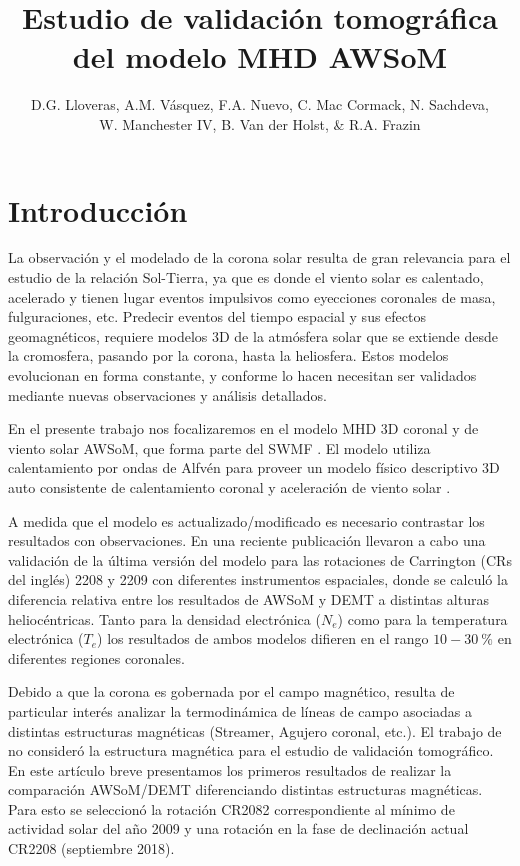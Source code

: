 \documentclass[baaa]{baaa}
\title{Estudio de validación tomográfica del modelo MHD AWSoM}
\author{D.G. Lloveras\inst{1}, A.M. Vásquez\inst{1}, F.A. Nuevo\inst{1}, C. Mac Cormack\inst{1}, N. Sachdeva\inst{2},\\ W. Manchester IV\inst{2}, B. Van der Holst\inst{2}, \& R.A. Frazin\inst{2}}
\institute{
Insituto de Astronomía y Física del Espacio, CONICET--UBA, Argentina \and
Climate and Space Sciences and Engineering, Universidad de Michigan, EEUU.
}
\begin{document}
\maketitle

\section{Introducción}
\label{S_intro}
La observación y el modelado de la corona solar resulta de gran relevancia para el estudio de la relación Sol-Tierra, 
ya que es donde el viento solar es calentado, acelerado y tienen lugar eventos impulsivos como eyecciones coronales de 
masa, fulguraciones, etc. Predecir eventos del tiempo espacial y sus efectos geomagnéticos, requiere modelos 3D de la 
atmósfera solar que se extiende desde la cromosfera, pasando por la corona, hasta la heliosfera. Estos modelos 
evolucionan en forma constante, y conforme lo hacen necesitan ser validados mediante nuevas observaciones y análisis 
detallados.

En el presente trabajo nos focalizaremos en el modelo MHD 3D coronal y de viento solar AWSoM, que forma parte del SWMF 
\citet{Toth_2012}. El modelo utiliza calentamiento por ondas de Alfvén para proveer un modelo físico descriptivo 3D 
auto consistente de calentamiento coronal y aceleración de viento solar \citep{sokolov_2013}  \citep{vander_2014}.

A medida que el modelo es {actualizado/modificado} es necesario contrastar los resultados con observaciones. En una 
reciente publicación \citet{sachdeva_2019} llevaron a cabo una validación de la última versión del modelo para las 
rotaciones de Carrington (CRs del inglés) 2208 y 2209 con diferentes instrumentos espaciales, donde se calculó la 
diferencia relativa entre los resultados de AWSoM y DEMT a distintas alturas heliocéntricas. Tanto para la densidad 
electrónica ($N_e$) como para la temperatura electrónica ($T_e$) los resultados de ambos modelos difieren en el rango 
$10-30~\%$ en diferentes regiones coronales.


Debido a que la corona es gobernada por el campo magnético, resulta de particular interés analizar la termodinámica de 
líneas de campo asociadas a distintas estructuras magnéticas (Streamer, Agujero coronal, etc.). El trabajo de 
\citet{sachdeva_2019} no consideró la estructura magnética para el estudio de validación tomográfico. En este artículo 
breve presentamos {los} primeros resultados de realizar la comparación AWSoM/DEMT diferenciando distintas estructuras 
magnéticas. Para esto se seleccionó la rotación CR2082 correspondiente al mínimo de actividad solar del año 2009 y una 
rotación en la fase de declinación actual CR2208 (septiembre 2018).
\end{document}
